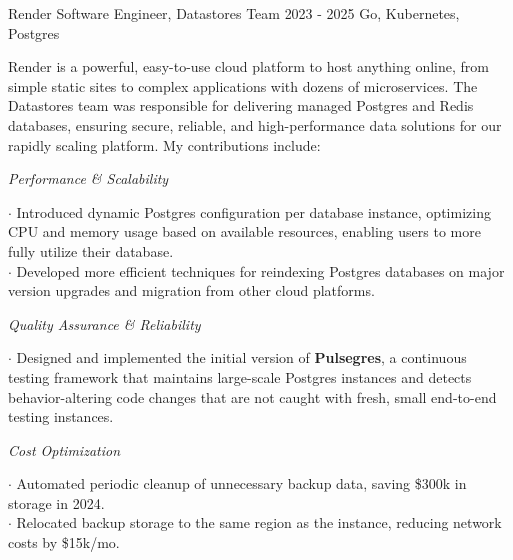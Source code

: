 \documentclass[]{clean-resume}
\begin{document}
\detailentry
  {Render}
  {Software Engineer, Datastores Team}
  {2023 - 2025}
  {Go, Kubernetes, Postgres}
  {
    Render is a powerful, easy-to-use cloud platform to host anything online, from simple static sites to complex applications with dozens of microservices. The Datastores team was responsible for delivering managed Postgres and Redis databases, ensuring secure, reliable, and high-performance data solutions for our rapidly scaling platform. My contributions include:

    \textit{Performance \& Scalability}
    \begin{addmargin}[1em]{0em}
      \phantom{~~}\hspace{-1em}$\cdot$ Introduced dynamic Postgres configuration per database instance, optimizing CPU and memory usage based on available resources, enabling users to more fully utilize their database. \\
      \phantom{~~}\hspace{-1em}$\cdot$ Developed more efficient techniques for reindexing Postgres databases on major version upgrades and migration from other cloud platforms.
    \end{addmargin}

    \textit{Quality Assurance \& Reliability}
    \begin{addmargin}[1em]{0em}
      \phantom{~~}\hspace{-1em}$\cdot$ Designed and implemented the initial version of \textbf{Pulsegres}, a continuous testing framework that maintains large-scale Postgres instances and detects behavior-altering code changes that are not caught with fresh, small end-to-end testing instances.
    \end{addmargin}

    \textit{Cost Optimization}
    \begin{addmargin}[1em]{0em}
      \phantom{~~}\hspace{-1em}$\cdot$ Automated periodic cleanup of unnecessary backup data, saving \$300k in storage in 2024. \\
      \phantom{~~}\hspace{-1em}$\cdot$ Relocated backup storage to the same region as the instance, reducing network costs by \$15k/mo.
    \end{addmargin}

}
\end{document}
